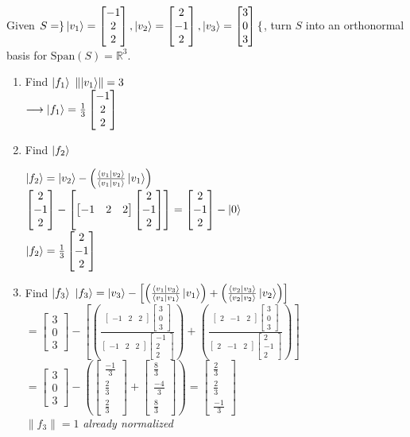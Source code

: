 \documentclass[12pt]{article}
\theoremstyle{plain}
\theoremstyle{nonumberplain}
\theoremstyle{plain}
\theoremstyle{nonumberplain}
\newcommand\1{{\bf 1}}
\newcommand{\bmat}[1]{\begin{bmatrix*} #1 \end{bmatrix*}} %
\newcommand{\R}{\mathbb{R}} %
\newcommand{\<}{\left\langle}
\renewcommand{\>}{\right\rangle}
\newcommand{\lp}{\left(}
\newcommand{\rp}{\right)}
\newcommand{\norm}[1]{\left\lVert#1\right\rVert} %
\newcommand{\inp}[2]{\left\langle#1\mid #2\right\rangle} %
\newcommand{\spn}[1]{\text{Span}\lp #1\rp} %
\begin{document}
Given $S=\rbrace\ket{v_1}=\bmat{-1 \\ 2 \\ 2}, \ket{v_2}=\bmat{2 \\ -1 \\ 2}, \ket{v_3}=\bmat{3 \\ 0 \\ 3}\lbrace$, turn $S$ into an orthonormal basis for $\spn{S}=\R^3$.
\begin{enumerate}
\item Find $\ket{f_1}$
$\norm{\ket{v_1}}=3$ \\
$\longrightarrow\ket{f_1}=\frac{1}{3}\bmat{-1 \\ 2 \\ 2}$ \\
\item Find $\ket{f_2}$
\begin{center}
$\ket{f_2}=\ket{v_2}-\left(\frac{\inp{v_1}{v_2}}{\inp{v_1}{v_1}}\ket{v_1}\right)$ \\
$\bmat{2 \\ -1 \\ 2}-\left[ \bmat{-1 & 2 & 2} \bmat{2 \\ -1 \\ 2} \right] =\bmat{2 \\ -1 \\ 2}-\ket{0}$ \\
$\ket{f_2}=\frac{1}{3}\bmat{2 \\ -1 \\ 2}$
\end{center}
\item Find $\ket{f_3}$
$\ket{f_3}=\ket{v_3}-\left[ \left( \frac{\inp{v_1}{v_3}}{\inp{v_1}{v_1}}\ket{v_1} \right) + \left( \frac{\inp{v_2}{v_3}}{\inp{v_2}{v_2}}\ket{v_2} \right)  \right]$ \\
$=\bmat{3 \\ 0 \\ 3}-\left[ \left( \frac{\bmat{-1 & 2 & 2}\bmat{3 \\ 0 \\ 3}}{\bmat{-1 & 2 & 2}\bmat{-1 \\ 2 \\ 2}} \right) + \left( \frac{\bmat{2 & -1 & 2}\bmat{3 \\ 0 \\ 3}}{\bmat{2 & -1 & 2}\bmat{2 \\ -1 \\ 2}} \right) \right]$ \\
$=\bmat{3 \\ 0 \\ 3}-\left( \bmat{\frac{-1}{3} \\ \frac{2}{3} \\ \frac{2}{3}} + \bmat{\frac{8}{3} \\ \frac{-4}{3} \\ \frac{8}{3}} \right) =\bmat{\frac{2}{3} \\ \frac{2}{3} \\ \frac{-1}{3}}$ \\
$\norm{f_3}=1$ \textit{already normalized}
\end{enumerate}
\end{document}
